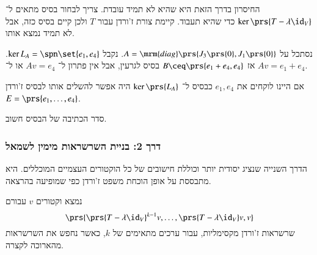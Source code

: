 \documentclass[a4paper,10pt,oneside,openany]{article}
\begin{document}
\begin{remark}
החיסרון בדרך הזאת היא שהיא לא תמיד עובדת. צריך לבחור בסיס מתאים ל־%
$\ker\prs{T-\lambda \id_V}$
כדי שהיא תעבוד. קיימת צורת ז'ורדן עבור
$T$
ולכן קיים בסיס כזה, אבל לא תמיד נמצא אותו.
\end{remark}

\begin{example}
נסתכל על
$A = \mrm{diag}\prs{J_3\prs{0}, J_1\prs{0}}$.
נקבל
$\ker L_A = \spn\set{e_1, e_4}$.
אז
$B \ceq \prs{e_1 + e_4, e_4}$
בסיס לגרעין, אבל אין פתרון ל־%
$Av = e_4$
או ל־%
$Av = e_1 + e_4$.

אם היינו לוקחים את
$e_1, e_4$
כבסיס ל־%
$\ker\prs{L_A}$
היה אפשר להשלים אותו לבסיס ז'ורדן
$E = \prs{e_1, \ldots, e_4}$.
\end{example}

\begin{remark}
סדר הכתיבה של הבסיס חשוב.
\end{remark}

\subsubsection{דרך 2: בניית השרשראות מימין לשמאל}

הדרך השנייה שנציג יסודית יותר וכוללת חישובים של כל הוקטורים העצמיים המוכללים. היא מתבססת על אופן הוכחת משפט ז'ורדן כפי שמופיעה בהרצאה.

נמצא וקטורים
$v$
עבורם
\[\prs{\prs{T - \lambda \id_V}^{k-1} v, \ldots, \prs{T-\lambda \id_V} v, v}\]
שרשראות ז'ורדן מקסימליות, עבור ערכים מתאימים של
$k$,
כאשר נחפש את השרשראות מהארוכה לקצרה.
\end{document}
